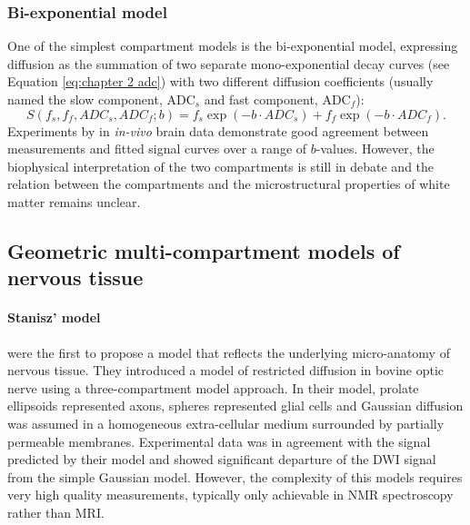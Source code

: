 \subsubsection{Bi-exponential model}
One of the simplest compartment models is the bi-exponential model, expressing diffusion as the summation of two separate mono-exponential decay curves (see Equation \ref{eq:chapter 2 adc}) with two different diffusion coefficients (usually named the slow component, \gls{ADC}$_{s}$ and fast component, \gls{ADC}$_{f}$):
{\footnotesize
\begin{equation}
	S(f_{s},f_{f},ADC_{s},ADC_{f}; b) = f_{s} \exp(-b\cdot ADC_{s}) + f_{f} \exp(-b\cdot ADC_{f}).
\end{equation}
}
Experiments by \citet{Clark:2002} in \emph{in-vivo} brain data demonstrate good agreement between measurements and fitted signal curves over a range of $b$-values. However, the biophysical interpretation of the two compartments is still in debate and the relation between the compartments and the microstructural properties of white matter remains unclear. 
\subsection{Geometric multi-compartment models of nervous tissue}
\paragraph*{Stanisz' model}
\citet{Stanisz:1997} were the first to propose a model that reflects the underlying micro-anatomy of nervous tissue. They introduced a model of restricted diffusion in bovine optic nerve using a three-compartment model approach. In their model, prolate ellipsoids represented axons, spheres represented glial cells and Gaussian diffusion was assumed in a homogeneous extra-cellular medium surrounded by partially permeable membranes. Experimental data was in agreement with the signal predicted by their model and showed significant departure of the {\gls{DWI}} signal from the simple Gaussian model. However, the complexity of this models requires very high quality measurements, typically only achievable in \gls{NMR} spectroscopy rather than MRI.
